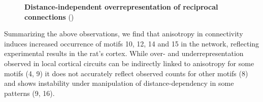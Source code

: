 \begin{figure}[htp]
  \centering
  \vfill
  \vspace{0.2cm}
  \vspace{0.2cm}
  \captionsetup{skip=7pt}
  \caption{\textbf{Distance-independent overrepresentation of
      reciprocal connections}  ()}
  \label{fig:cm_rule}
\end{figure}







Summarizing the above observations, we find that  anisotropy in connectivity induces increased occurrence of
motifs 10, 12, 14 and 15 in the network, reflecting experimental
results in the rat's cortex.  While over- and underrepresentation
observed in local cortical circuits can be indirectly linked to
anisotropy for some motifs (4, 9) it does not accurately reflect
observed counts for other motifs (8) and shows instability under
manipulation of distance-dependency in some patterns (9, 16).







